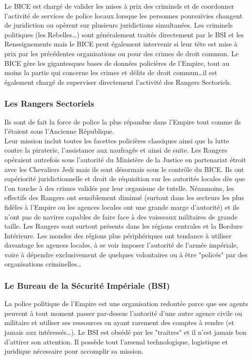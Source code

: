 \documentclass[twoside]{article}
\begin{document}
Le BICE est chargé de valider les mises à prix des criminels et de coordonner l'activité de services de police locaux lorsque les personnes poursuivies changent de juridiction ou opèrent sur plusieurs juridictions simultanées. Les criminels politiques (les Rebelles\ldots)  sont généralement traités directement par le BSI et les Renseignements mais le BICE peut également intervenir si leur tête est mise à prix par les précédentes organisations ou pour des crimes de droit commun. Le BICE gère les gigantesques bases de données policières de l'Empire, tout au moins la partie qui concerne les crimes et délits de droit commun\ldots il est également chargé de superviser directement l'activité des Rangers Sectoriels. 

\subsubsection{Les Rangers Sectoriels}
Ils sont de fait la force de police la plus répandue dans l'Empire tout comme ils l'étaient sous l'Ancienne République.\\

Leur mission inclut toutes les facettes policières classiques ainsi que la lutte contre la piraterie, l'assistance aux naufragés et ainsi de suite. Les Rangers opéraient autrefois sous l'autorité du Ministère de la Justice en partenariat étroit avec les Chevaliers Jedi mais ils sont désormais sous le contrôle du BICE.  Ils ont supériorité juridictionnelle et droit de réquisition sur les autorités locales dès que l'on touche à des crimes validés par leur organisme de tutelle. Néanmoins, les effectifs des Rangers ont sensiblement diminué (surtout dans les secteurs les plus fidèles à l'Empire ou les agences locales ont une grande marge d'autorité) et ils n'ont pas de navires capables de faire face à des vaisseaux militaires de grande taille. Les Rangers sont surtout présents dans les régions centrales et la Bordure Intérieure. Les mondes des régions plus périphériques ont tendance à utiliser davantage les agences locales, à se voir imposer l'autorité de l'armée impériale, voire à dépendre exclusivement de quelques volontaires ou à être "policés" par des organisations criminelles\ldots

\subsubsection{Le Bureau de la Sécurité Impériale (BSI)}
La police politique de l'Empire est une organisation redoutée parce que ses agents peuvent à tout moment passer par-dessus l'autorité d'une autre agence civile ou militaire et utiliser ses ressources en ayant rarement des comptes à rendre (et jamais aux intéressés\ldots). Le BSI est obsédé par les "traitres" et il n'est jamais bon d'attirer son attention. Il possède tout l'arsenal technologique, logistique et juridique nécessaire pour accomplir sa mission.  
\end{document}
